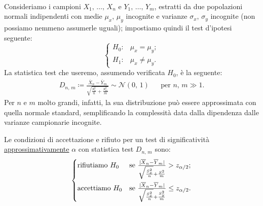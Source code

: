         \begin{defn}[$\mu_x=\mu_y=\,?,\, \sigma^2_x=\sigma^2_y=\,?,\, \sigma^2_x \equiv \sigma^2_y$]
            \hfill \\
            Consideriamo i campioni $X_1,\, \ldots,\, X_{n}$ e $Y_1,\, \ldots,\, Y_{m}$, estratti da due 
            popolazioni normali indipendenti con medie $\mu_x,\, \mu_y$ incognite e varianze 
            $\sigma_x,\, \sigma_y$ incognite (non possiamo nemmeno assumerle uguali); impostiamo quindi il 
            test d'ipotesi seguente: \[
                \begin{cases}
                    H_0 : & \mu_x = \mu_y; \\
                    H_1 : & \mu_x \neq \mu_y.
                \end{cases}
            \] La statistica test che useremo, assumendo verificata $H_0$, è la seguente:
            \begin{align*}
                D_{n,\,m} \coloneqq \frac{\overline{X}_n -\overline{Y}_m}{\sqrt{\frac{S_n^2}{n} 
                +\frac{S_m^2}{m}}} \sim \mathcal{N}(0,\,1) & &
                \text{per } n,\,m \gg 1
            .\end{align*}
            Per $n$ e $m$ molto grandi, infatti, la sua distribuzione può essere approssimata con 
            quella normale standard, semplificando la complessità data dalla dipendenza dalle varianze 
            campionarie incognite.

            Le condizioni di accettazione e rifiuto per un test di significatività 
            \underline{approssimativamente} $\alpha$ con statistica test $D_{n,\,m}$ sono: \[
            \begin{cases}
                \text{rifiutiamo } H_0 & 
                \text{se $\frac{|\overline{X}_n -\overline{Y}_m|}{\sqrt{\frac{S_x^2}{n}} 
                +\frac{S^2}{m}} > z_{\alpha /2}$;} \\
                \vspace{-1em} \\
                \text{accettiamo } H_0 & 
                \text{se $\frac{|\overline{X}_n -\overline{Y}_m|}{\sqrt{\frac{S_x^2}{n}} 
                +\frac{S_y^2}{m}} \leq z_{\alpha /2}$.}
            \end{cases}
            \]
        \end{defn}

